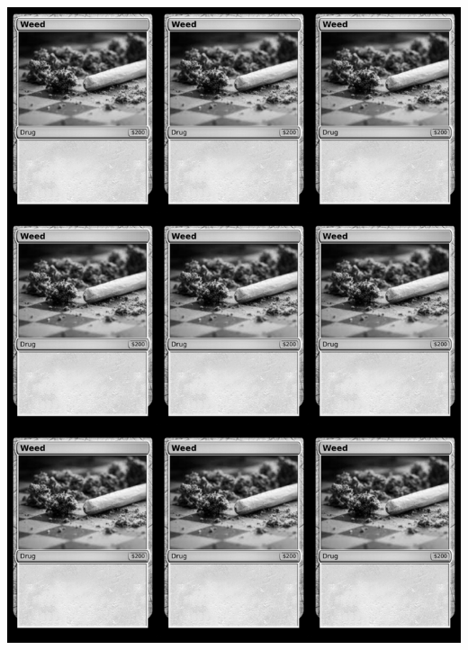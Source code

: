 \documentclass[a4paper]{article}
\begin{document}
\begin{center}
	\centering
	\includegraphics[width=190.5mm,height=266.7mm]{output/temp/page1.png}
\end{center}

\newpage
\end{document}
